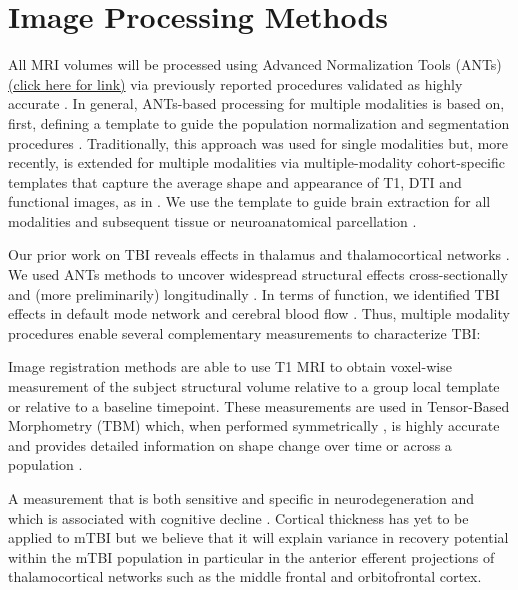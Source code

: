 \section{Image Processing Methods}

All MRI volumes will be processed using Advanced Normalization Tools
(ANTs) \href{http://www.picsl.upenn.edu/ANTS}{(click here for
link)}\cite{Avants2011a,Avants2011,Murphy2011,Tustison2010,Tustison2011,Tustison2011a}
via previously reported procedures validated as highly accurate
\cite{Klein2009,Klein2010,Murphy2011,Avants2011}.  In general, ANTs-based
processing for multiple modalities is based on, first, defining a
template to guide the population normalization and segmentation
procedures \cite{Avants2011a,Avants2011}.  Traditionally, this
approach was used for single modalities but, more recently, is
extended for multiple modalities via multiple-modality cohort-specific templates
that capture the average shape and appearance of T1, DTI and
functional images, as in \cite{Kim2010,Avants2011a,Jain2012,Tustison2012}.  We use the
template to guide brain extraction for all modalities and subsequent
tissue or neuroanatomical parcellation \cite{Avants2011a,Wang2013}.  

Our prior work on TBI reveals effects in thalamus \cite{Avants2008a}
and thalamocortical networks \cite{J.T.Duda2008}.  We used ANTs
methods to uncover widespread structural effects cross-sectionally
\cite{Kim2008} and (more preliminarily) longitudinally \cite{Kim2013}.
In terms of function, we identified TBI effects in default mode
network \cite{Duda2013} and cerebral blood flow \cite{Kim2010}.  Thus,
multiple modality procedures enable several complementary measurements
to characterize TBI:

 Image
registration methods are able to use T1 MRI to obtain voxel-wise
measurement of the subject structural volume relative to a group local
template or relative to a baseline timepoint.  These measurements are
used in Tensor-Based Morphometry (TBM) which, when performed
symmetrically \cite{Yushkevich2010a,Das2012}, is highly accurate and
provides detailed information on shape change over time
\cite{Brambati2007,Hua2011,Kim2013} or across a population
\cite{Kim2008,Massimo2009,Morgan2011,Hanson2010,Hanson2012}.  

  A measurement
that is both sensitive and specific in neurodegeneration
\cite{Stricker2012,Libon2012,McMillan2013} and which is associated
with cognitive decline \cite{Dickerson2011,Avants2010}.  Cortical
thickness has yet to be applied to mTBI but we believe that it will
explain variance in recovery potential within the mTBI population in
particular in the anterior efferent projections of thalamocortical networks
such as the middle frontal and orbitofrontal cortex.

